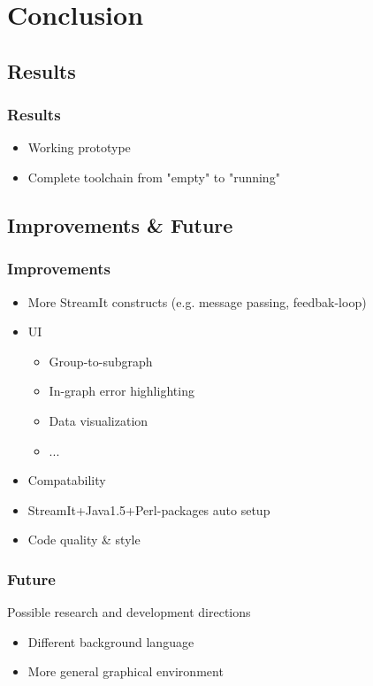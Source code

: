 \documentclass{beamer}
\begin{document}
\section{Conclusion}

\subsection{Results}
\begin{frame}
\frametitle{Results}
	\begin{itemize}
		\item Working prototype
		\item Complete toolchain from "empty" to "running"
	\end{itemize}
\end{frame}

\subsection{Improvements \& Future}
\begin{frame}
\frametitle{Improvements}
	\begin{itemize}
		\item More StreamIt constructs (e.g. message passing, feedbak-loop)
		\item UI
		\begin{itemize}
			\item Group-to-subgraph
			\item In-graph error highlighting
			\item Data visualization
			\item ...
		\end{itemize}
		\item Compatability
		\item StreamIt+Java1.5+Perl-packages auto setup
		\item Code quality \& style
	\end{itemize}
\end{frame}

\begin{frame}
\frametitle{Future}
Possible research and development directions
	\begin{itemize}
		\item Different background language
		\item More general graphical environment
	\end{itemize}
\end{frame}
\end{document}
